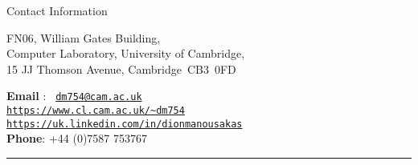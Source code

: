 \documentclass[11pt]{resume}
\author{Dionysis T. Manousakas}
\begin{document}
\maketitle
\vspace{-1cm}

\begin{category}{Contact Information}

\citemnobullet{} 
\vspace{-1.5cm}
\newline 
\begin{multicols}{2}
	FN06, William Gates Building,\\
	Computer Laboratory, 
	University of Cambridge,\\
	15 JJ Thomson Avenue, \mbox{Cambridge CB3 0FD} 
	
\columnbreak

	\textbf{Email} : 
	\mbox{  \\ \tt
		\href{mailto:dm754@cl.cam.ac.uk}{dm754@cam.ac.uk}}\\
	\mbox{\small\tt \href{https://www.cl.cam.ac.uk/~dm754}{\url{https://www.cl.cam.ac.uk/~dm754}}} \\
	\mbox{\small\tt \href{https://uk.linkedin.com/in/dionmanousakas}{https://uk.linkedin.com/in/dionmanousakas}} \\
	\textbf{Phone}:  +44 (0)7587 753767 \\
\end{multicols}
\vspace{-1.cm}
	\noindent\rule{\textwidth}{0.2pt}
\end{category}
\end{document}

